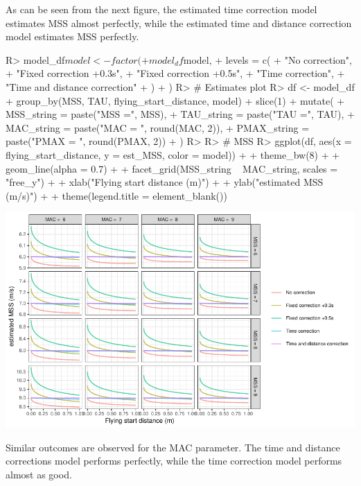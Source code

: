 \documentclass[
]{jss}
\begin{document}
As can be seen from the next figure, the estimated time correction model estimates MSS almost perfectly, while the estimated time and distance correction model estimates MSS perfectly.

\begin{CodeChunk}
\begin{CodeInput}
R> model_df$model <- factor(
+   model_df$model,
+   levels = c(
+     "No correction",
+     "Fixed correction +0.3s",
+     "Fixed correction +0.5s",
+     "Time correction",
+     "Time and distance correction"
+   )
+ )
R> # Estimates plot
R> df <- model_df %
+   group_by(MSS, TAU, flying_start_distance, model) %
+   slice(1) %
+   mutate(
+     MSS_string = paste("MSS =", MSS),
+     TAU_string = paste("TAU =", TAU),
+     MAC_string = paste("MAC = ", round(MAC, 2)),
+     PMAX_string = paste("PMAX = ", round(PMAX, 2))
+   )
R> 
R> # MSS
R> ggplot(df, aes(x = flying_start_distance, y = est_MSS, color = model)) +
+   theme_bw(8) +
+   geom_line(alpha = 0.7) +
+   facet_grid(MSS_string ~ MAC_string, scales = "free_y") +
+   xlab("Flying start distance (m)") +
+   ylab("estimated MSS (m/s)") +
+   theme(legend.title = element_blank())
\end{CodeInput}


\begin{center}\includegraphics[width=1\linewidth]{paper_files/figure-latex/unnamed-chunk-35-1} \end{center}

\end{CodeChunk}

Similar outcomes are observed for the MAC parameter. The time and distance corrections model performs perfectly, while the time correction model performs almost as good.
\end{document}
